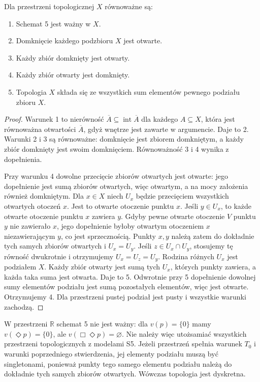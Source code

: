\begin{stwierdzenie}
\label{prop:ncl-modal-topological-S5}
Dla przestrzeni topologicznej $X$ równoważne są:
\begin{enumerate}
\item Schemat 5 jest ważny w $X$.
\item Domknięcie każdego podzbioru $X$ jest otwarte.
\item Każdy zbiór domknięty jest otwarty.
\item Każdy zbiór otwarty jest domknięty.
\item Topologia $X$ składa się ze wszystkich sum
      elementów pewnego podziału zbioru $X$.
\end{enumerate}
\end{stwierdzenie}
\begin{proof}
Warunek 1 to nierówność
$\overline A\subseteq\operatorname{int}\overline A$
dla każdego $A\subseteq X$, która jest
równoważna otwartości $\overline A$,
gdyż wnętrze jest zawarte w argumencie.
Daje to 2. Warunki 2 i 3 są równoważne:
domknięcie jest zbiorem domkniętym,
a każdy zbiór domknięty jest swoim domknięciem.
Równoważność 3 i 4 wynika z dopełnienia.

Przy warunku 4 dowolne przecięcie zbiorów
otwartych jest otwarte: jego dopełnienie
jest sumą zbiorów otwartych, więc otwartym,
a na mocy założenia również domkniętym.
Dla $x\in X$ niech $U_x$ będzie przecięciem
wszystkich otwartych otoczeń $x$.
Jest to otwarte otoczenie punktu $x$.
Jeśli $y\in U_x$, to każde otwarte
otoczenie punktu $x$ zawiera $y$.
Gdyby pewne otwarte otoczenie $V$ punktu $y$
nie zawierało $x$, jego dopełnienie byłoby
otwartym otoczeniem $x$ niezawierającym $y$,
co jest sprzecznością.
Punkty $x,y$ należą zatem do dokładnie
tych samych zbiorów otwartych i $U_x=U_y$.
Jeśli $z\in U_x\cap U_y$, stosujemy tę
równość dwukrotnie i otrzymujemy
$U_x=U_z=U_y$.
Rodzina różnych $U_x$ jest podziałem $X$.
Każdy zbiór otwarty jest sumą tych $U_x$,
których punkty zawiera, a każda taka suma
jest otwarta. Daje to 5.
Odwrotnie przy 5 dopełnienie dowolnej sumy
elementów podziału jest sumą pozostałych
elementów, więc jest otwarte. Otrzymujemy 4.
Dla przestrzeni pustej podział jest pusty
i wszystkie warunki zachodzą.
\end{proof}

W przestrzeni $\mathbb R$ schemat 5 nie jest
ważny: dla $v(p)=\{0\}$ mamy
$v(\Diamond p)=\{0\}$, ale
$v(\Box\Diamond p)=\varnothing$.
Nie należy więc utożsamiać wszystkich
przestrzeni topologicznych z modelami S5.
Jeżeli przestrzeń spełnia warunek $T_0$
i warunki poprzedniego stwierdzenia, jej
elementy podziału muszą być singletonami,
ponieważ punkty tego samego elementu
podziału należą do dokładnie tych samych
zbiorów otwartych. Wówczas topologia
jest dyskretna.

